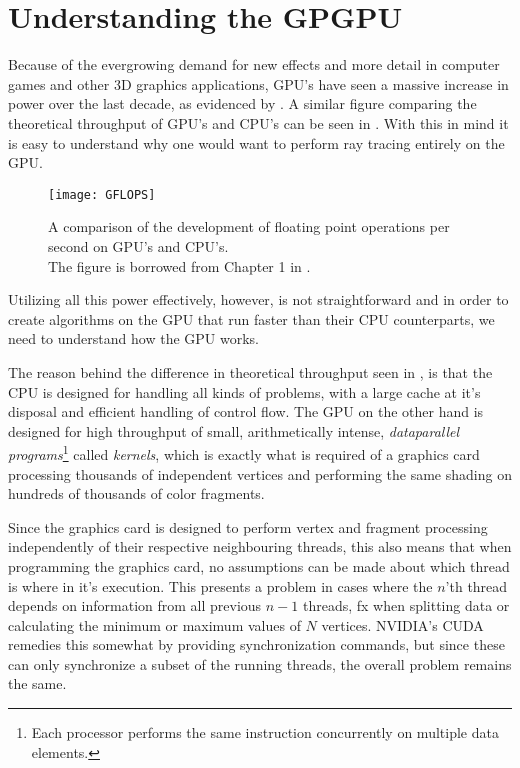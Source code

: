 \chapter{Understanding the GPGPU}\label{chp:GPGPU}





Because of the evergrowing demand for new effects and more detail in
computer games and other 3D graphics applications, GPU's have seen a
massive increase in power over the last decade, as evidenced by
. A similar figure comparing the theoretical
throughput of GPU's and CPU's can be seen in . With
this in mind it is easy to understand why one would want to perform
ray tracing entirely on the GPU.

\begin{figure}
  \centering
  \texttt{[image: GFLOPS]}
  
  \parbox{9cm}{\caption[Comparison of floating point operations per
      second on GPU's and CPU's.]{A comparison of the development of
      floating point operations per second on GPU's and CPU's. \\The
      figure is borrowed from Chapter 1 in
      .}\label{fig:gflops}}
\end{figure}


Utilizing all this power effectively, however, is not straightforward
and in order to create algorithms on the GPU that run faster than their
CPU counterparts, we need to understand how the GPU works.

The reason behind the difference in theoretical throughput seen in
, is that the CPU is designed for handling all
kinds of problems, with a large cache at it's disposal and efficient
handling of control flow. The GPU on the other hand is designed for
high throughput of small, arithmetically intense, \textit{dataparallel
  programs}\footnote{Each processor performs the same instruction
  concurrently on multiple data elements.} called \textit{kernels},
which is exactly what is required of a graphics card processing
thousands of independent vertices and performing the same shading on
hundreds of thousands of color fragments.

Since the graphics card is designed to perform vertex and fragment
processing independently of their respective neighbouring threads,
this also means that when programming the graphics card, no
assumptions can be made about which thread is where in it's
execution. This presents a problem in cases where the $n$'th thread
depends on information from all previous $n-1$ threads, fx when
splitting data or calculating the minimum or maximum values of $N$
vertices. NVIDIA's CUDA remedies this somewhat by providing
synchronization commands, but since these can only synchronize a
subset of the running threads, the overall problem remains the same.

